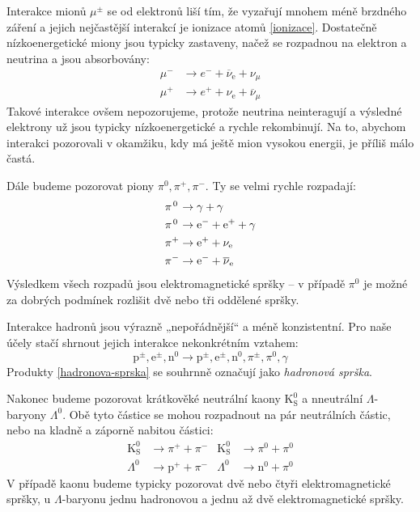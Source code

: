 \documentclass[10pt,a4paper]{article}
\newcommand*{\mask}[2]{\mathord{\makebox[\widthof{\(#1\)}]{\(#2\)}}}
\newcommand{\°}{\degree}
\renewcommand{\t}[1]{\mathrm{#1}}
\begin{document}
Interakce mionů $\mu^\pm$ se od elektronů liší tím, že vyzařují mnohem méně brzdného záření a jejich nejčastější interakcí je ionizace atomů \eqref{ionizace}. Dostatečně nízkoenergetické miony jsou typicky zastaveny, načež se rozpadnou na elektron a neutrina a jsou absorbovány:
\begin{equation}
    \begin{aligned}
        \mu^- &\to e^- + \overline{\nu}_{\t e} + \nu_\mu \\
        \mu^+ &\to e^+ + \nu_{\t e} + \overline{\nu}_\mu
    \end{aligned}
    \label{rozpad-mu}
\end{equation}
Takové interakce ovšem nepozorujeme, protože neutrina neinteragují a výsledné elektrony už jsou typicky nízkoenergetické a rychle rekombinují. Na to, abychom interakci pozorovali v okamžiku, kdy má ještě mion vysokou energii, je příliš málo častá.

Dále budeme pozorovat piony $\pi^0, \pi^+, \pi^-$. Ty se velmi rychle rozpadají:
\begin{equation}
    \begin{aligned}
        \pi{\mask{^+}{^0}} &\to \gamma + \gamma \\
        \pi{\mask{^+}{^0}} &\to \t e^- + \t e^+ + \gamma \\
        \pi^+ &\to \t e^+ + \nu_{\t e} \\
        \pi^- &\to \t e^- + \overline{\nu}_{\t e}
    \end{aligned}
    \label{rozpad-pi}
\end{equation}
Výsledkem všech rozpadů jsou elektromagnetické spršky – v případě $\pi^0$ je možné za dobrých podmínek rozlišit dvě nebo tři oddělené spršky.

Interakce hadronů jsou výrazně „nepořádnější“ a méně konzistentní. Pro naše účely stačí shrnout jejich interakce nekonkrétním vztahem:
\begin{equation}
    \t p^\pm, \t e^\pm, \t n^0 \to
    \t p^\pm, \t e^\pm, \t n^0, \pi^\pm, \pi^0, \gamma
    \label{hadronova-sprska}
\end{equation}
Produkty \eqref{hadronova-sprska} se souhrnně označují jako \textit{hadronová sprška}.

Nakonec budeme pozorovat krátkověké neutrální kaony $\t K^0_{\t S}$ a nneutrální $\Lambda$-baryony $\Lambda^0$. Obě tyto částice se mohou rozpadnout na pár neutrálních částic, nebo na kladně a záporně nabitou částici:
\begin{equation}
    \begin{aligned}
        \t K^0_{\t S} &\to \pi^+ + \pi^- &
        \t K^0_{\t S} &\to \pi^0 + \pi^0 \\[3pt]
        \Lambda^0 &\to \t p^+ + \pi^- &
        \Lambda^0 &\to \t n^0 + \pi^0
    \end{aligned}
    \label{kaon-lambda}
\end{equation}
V případě kaonu budeme typicky pozorovat dvě nebo čtyři elektromagnetické spršky, u $\Lambda$-baryonu jednu hadronovou a jednu až dvě elektromagnetické spršky.
\end{document}
